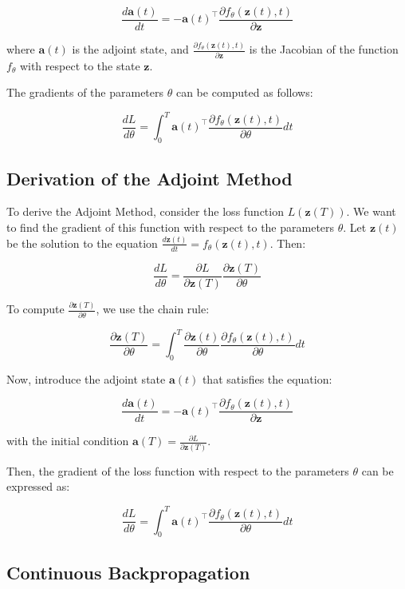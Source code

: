 \documentclass[a4paper,12pt]{article}
\theoremstyle{plain} %
\theoremstyle{definition} %
\theoremstyle{remark} %
\begin{document}
\[ \frac{d\mathbf{a}(t)}{dt} = -\mathbf{a}(t)^\top \frac{\partial f_\theta(\mathbf{z}(t), t)}{\partial \mathbf{z}} \]

where \( \mathbf{a}(t) \) is the adjoint state, and \( \frac{\partial f_\theta(\mathbf{z}(t), t)}{\partial \mathbf{z}} \) is the Jacobian of the function \( f_\theta \) with respect to the state \( \mathbf{z} \).

The gradients of the parameters \( \theta \) can be computed as follows:

\[ \frac{dL}{d\theta} = \int_0^T \mathbf{a}(t)^\top \frac{\partial f_\theta(\mathbf{z}(t), t)}{\partial \theta} dt \]

\subsection{Derivation of the Adjoint Method}

To derive the Adjoint Method, consider the loss function \( L(\mathbf{z}(T)) \). We want to find the gradient of this function with respect to the parameters \( \theta \). Let \( \mathbf{z}(t) \) be the solution to the equation \( \frac{d\mathbf{z}(t)}{dt} = f_\theta(\mathbf{z}(t), t) \). Then:

\[ \frac{dL}{d\theta} = \frac{\partial L}{\partial \mathbf{z}(T)} \frac{\partial \mathbf{z}(T)}{\partial \theta} \]

To compute \( \frac{\partial \mathbf{z}(T)}{\partial \theta} \), we use the chain rule:

\[ \frac{\partial \mathbf{z}(T)}{\partial \theta} = \int_0^T \frac{\partial \mathbf{z}(t)}{\partial \theta} \frac{\partial f_\theta(\mathbf{z}(t), t)}{\partial \theta} dt \]

Now, introduce the adjoint state \( \mathbf{a}(t) \) that satisfies the equation:

\[ \frac{d\mathbf{a}(t)}{dt} = -\mathbf{a}(t)^\top \frac{\partial f_\theta(\mathbf{z}(t), t)}{\partial \mathbf{z}} \]

with the initial condition \( \mathbf{a}(T) = \frac{\partial L}{\partial \mathbf{z}(T)} \).

Then, the gradient of the loss function with respect to the parameters \( \theta \) can be expressed as:

\[ \frac{dL}{d\theta} = \int_0^T \mathbf{a}(t)^\top \frac{\partial f_\theta(\mathbf{z}(t), t)}{\partial \theta} dt \]

\subsection{Continuous Backpropagation}
\end{document}
